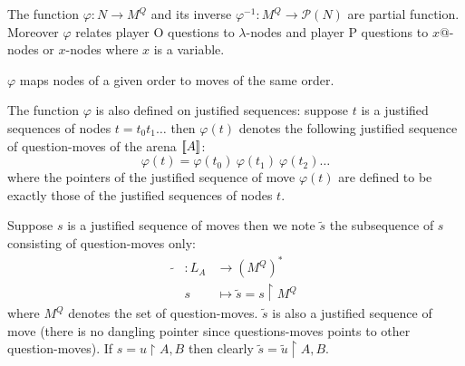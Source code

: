 The function $\varphi : N \rightarrow M^Q$ and its inverse
$\varphi^{-1} : M^Q \rightarrow \mathcal{P}(N)$ are partial function.
Moreover $\varphi$ relates player O questions to $\lambda$-nodes
and player P questions to $x @$-nodes or $x$-nodes where $x$ is a variable.

\begin{property}
\label{proper:phi_conserve_order}
$\varphi$ maps nodes of a given order to moves of the same order.
\end{property}


The function $\varphi$ is also defined on justified sequences: suppose $t$
is a justified sequences of nodes $t = t_0 t_1 \ldots$ then $\varphi(t)$ denotes
the following justified sequence of question-moves of the arena ${[\![ A ]\!]}$:
$$\varphi(t) = \varphi(t_0)\ \varphi(t_1)\  \varphi(t_2) \ldots$$
where the pointers of the justified sequence of move $\varphi(t)$ are defined to be exactly those
of the justified sequences of nodes $t$.

\begin{dfn}
Suppose $s$ is a justified sequence of moves then we note $\tilde{s}$
the subsequence of $s$ consisting of question-moves only:
\begin{eqnarray*}
\tilde{} &: L_A &\longrightarrow (M^Q)^* \\
& s &\longmapsto \tilde{s} = s \upharpoonright M^Q
\end{eqnarray*}
where $M^Q$ denotes the set of question-moves.
$\tilde{s}$ is also a justified sequence of move (there is no dangling pointer since questions-moves points to other question-moves).
If $s = u\upharpoonright A,B$ then clearly $\tilde{s} = \tilde{u} \upharpoonright A,B$.
\end{dfn}



